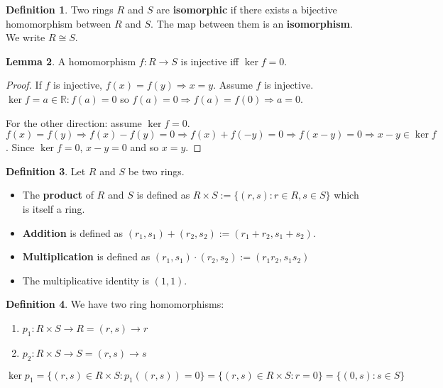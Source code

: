 \documentclass[12pt,a4paper]{article}
\theoremstyle{definition}
\newtheorem{definition}{Definition}[subsection]
\newtheorem{lemma}[definition]{Lemma}
\begin{document}
\begin{definition}
	Two rings $R$ and $S$ are \textbf{isomorphic} if there exists a bijective homomorphism between $R$ and $S$. The map between them is an \textbf{isomorphism}. We write $R \cong S$.
\end{definition}

\begin{lemma}
	A homomorphism $f: R \rightarrow S$ is injective iff $\ker f = {0}$.
\end{lemma}

\begin{proof}
	If $f$ is injective, $f(x) = f(y) \Rightarrow x = y$. Assume $f$ is injective. $\ker f = {a \in \mathbb{R}: f(a) = 0}$ so $f(a) = 0 \Rightarrow f(a) = f(0) \Rightarrow a = 0$.

	For the other direction: assume $\ker f = {0}$. $f(x) = f(y) \Rightarrow f(x) - f(y) = 0 \Rightarrow f(x) + f(-y) = 0 \Rightarrow f(x - y) = 0 \Rightarrow x - y \in \ker f$. Since $\ker f = {0}$, $x - y = 0$ and so $x = y$.
\end{proof}

\begin{definition}
	Let $R$ and $S$ be two rings.
	\begin{itemize}
		\item The \textbf{product} of $R$ and $S$ is defined as $R \times S := \{(r, s): r \in R, s \in S\}$ which is itself a ring.
		\item \textbf{Addition} is defined as $(r_1, s_1) + (r_2, s_2) := (r_1 + r_2, s_1 + s_2)$.
		\item \textbf{Multiplication} is defined as $(r_1, s_1) \cdot (r_2, s_2) := (r_1 r_2, s_1 s_2)$
		\item The multiplicative identity is $(1, 1)$.
	\end{itemize}
\end{definition}

\begin{definition}
	We have two ring homomorphisms:
	\begin{enumerate}
		\item $p_1: R \times S \rightarrow R = (r, s) \rightarrow r$
		\item $p_2: R \times S \rightarrow S = (r, s) \rightarrow s$
	\end{enumerate}

	$\ker p_1 = \{(r, s) \in R \times S: p_1((r, s)) = 0\} = \{(r, s) \in R \times S: r = 0\} = \{(0, s): s \in S\}$
\end{definition}
\end{document}
